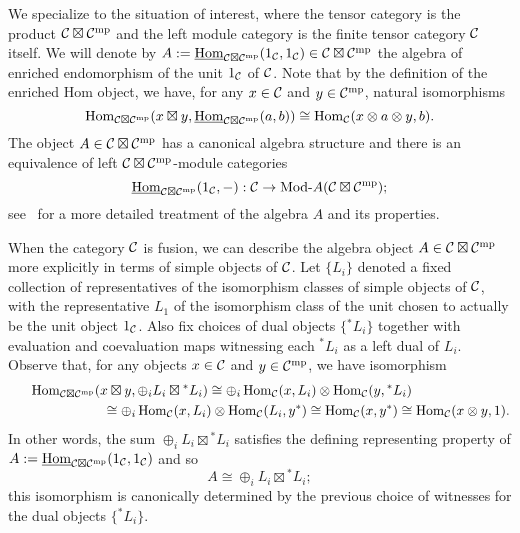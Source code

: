 \documentclass{amsart}
\begin{document}
We specialize to the situation of interest, where the tensor category is the product $\mathcal C \boxtimes \mathcal C^{\mathrm{mp}}$ and the left module category is the finite tensor category $\mathcal C$ itself.  We will denote by $A := \operatorname{\underline{Hom}}_{\mathcal C \boxtimes \mathcal C^{\mathrm{mp}}}(1_\mathcal C,1_\mathcal C) \in \mathcal C \boxtimes \mathcal C^{\mathrm{mp}}$ the algebra of enriched endomorphism of the unit $1_\mathcal C$ of $\mathcal C$.  Note that by the definition of the enriched Hom object, we have, for any $x \in \mathcal C$ and $y \in \mathcal C^{\mathrm{mp}}$, natural isomorphisms
\[
\operatorname{Hom}_{\mathcal C \boxtimes \mathcal C^{\mathrm{mp}}}(x \boxtimes y, \operatorname{\underline{Hom}}_{\mathcal C \boxtimes \mathcal C^{\mathrm{mp}}}(a,b)) \cong \operatorname{Hom}_\mathcal C(x \otimes a \otimes y,b).
\]
The object $A \in \mathcal C \boxtimes \mathcal C^{\mathrm{mp}}$ has a canonical algebra structure and there is an equivalence of left $\mathcal C \boxtimes \mathcal C^{\mathrm{mp}}$-module categories
\[
\IHom_{\cC \boxtimes \cC^\mp}(1_\cC,-) : \cC \ra \Mod{}{A}(\cC \boxtimes \cC^\mp);
\]
see~\cite[\S 2]{MR2097289} for a more detailed treatment of the algebra $A$ and its properties.


When the category $\mathcal C$ is fusion, we can describe the algebra object $A \in \mathcal C \boxtimes \mathcal C^{\mathrm{mp}}$ more explicitly in terms of simple objects of $\mathcal C$.  Let $\{L_i\}$ denoted a fixed collection of representatives of the isomorphism classes of simple objects of $\mathcal C$, with the representative $L_1$ of the isomorphism class of the unit chosen to actually be the unit object $1_\mathcal C$.  Also fix choices of dual objects $\{{}^* L_i\}$ together with evaluation and coevaluation maps witnessing each ${}^* L_i$ as a left dual of $L_i$.  Observe that, for any objects $x \in \mathcal C$ and $y \in \mathcal C^{\mathrm{mp}}$, we have isomorphism
\[
\begin{split}
\operatorname{Hom}_{\mathcal C \boxtimes \mathcal C^{\mathrm{mp}}}( x \boxtimes y , \oplus_i L_i \boxtimes {}^* L_i)
\cong
\oplus_i \operatorname{Hom}_{\mathcal C}(x, L_i) \otimes \operatorname{Hom}_{\mathcal C}(y, {}^*L_i) \hspace*{1in}\\\hspace*{1in}
\cong
\oplus_i \operatorname{Hom}_{\mathcal C}(x, L_i) \otimes \operatorname{Hom}_{\mathcal C}(L_i, y^*)
\cong
\operatorname{Hom}_{\mathcal C}(x, y^*)
\cong
\operatorname{Hom}_{\mathcal C}(x \otimes y, 1).
\end{split}
\]
In other words, the sum $\oplus_i L_i \boxtimes {}^* L_i$ satisfies the defining representing property of $A := \operatorname{\underline{Hom}}_{\mathcal C \boxtimes \mathcal C^{\mathrm{mp}}}(1_\mathcal C,1_\mathcal C)$ and so
\[
A \cong \oplus_i L_i \boxtimes {}^* L_i;
\]
this isomorphism is canonically determined by the previous choice of witnesses for the dual objects $\{{}^* L_i\}$.
\end{document}
